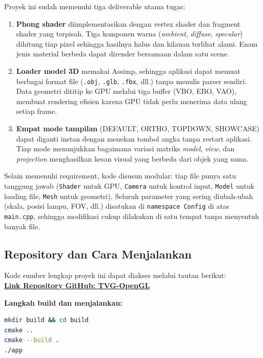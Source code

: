 \documentclass[12pt,a4paper]{article}
\begin{document}
Proyek ini sudah memenuhi tiga deliverable utama tugas:

\begin{enumerate}
    \item \textbf{Phong shader} diimplementasikan dengan vertex shader dan fragment shader yang terpisah. Tiga komponen warna (\textit{ambient}, \textit{diffuse}, \textit{specular}) dihitung tiap pixel sehingga hasilnya halus dan kilauan terlihat alami. Enam jenis material berbeda dapat dirender bersamaan dalam satu scene.

    \item \textbf{Loader model 3D} memakai Assimp, sehingga aplikasi dapat memuat berbagai format file (\texttt{.obj}, \texttt{.glb}, \texttt{.fbx}, dll.) tanpa menulis parser sendiri. Data geometri dititip ke GPU melalui tiga buffer (VBO, EBO, VAO), membuat rendering efisien karena GPU tidak perlu menerima data ulang setiap frame.

    \item \textbf{Empat mode tampilan} (DEFAULT, ORTHO, TOPDOWN, SHOWCASE) dapat diganti instan dengan menekan tombol angka tanpa restart aplikasi. Tiap mode menunjukkan bagaimana variasi matriks \textit{model}, \textit{view}, dan \textit{projection} menghasilkan kesan visual yang berbeda dari objek yang sama.
\end{enumerate}

Selain memenuhi requirement, kode disusun modular: tiap file punya satu tanggung jawab (\texttt{Shader} untuk GPU, \texttt{Camera} untuk kontrol input, \texttt{Model} untuk loading file, \texttt{Mesh} untuk geometri). Seluruh parameter yang sering diubah-ubah (skala, posisi lampu, FOV, dll.) disatukan di \texttt{namespace Config} di atas \texttt{main.cpp}, sehingga modifikasi cukup dilakukan di satu tempat tanpa menyentuh banyak file.

\subsection{Repository dan Cara Menjalankan}
Kode sumber lengkap proyek ini dapat diakses melalui tautan berikut:\\
\href{https://github.com/gadicandra/TVG-OpenGL}{\textbf{Link Repository GitHub: TVG-OpenGL}}

\vspace{0.5cm}
\textbf{Langkah build dan menjalankan:}
\begin{lstlisting}[language=bash, numbers=none]
mkdir build && cd build
cmake ..
cmake --build .
./app
\end{lstlisting}
\end{document}
